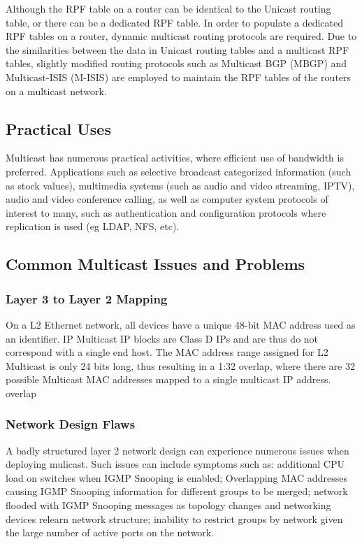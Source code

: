Although the RPF table on a router can be identical to the Unicast
routing table, or there can be a dedicated RPF table. In order to 
populate a dedicated RPF tables on a router, dynamic multicast 
routing protocols are required. Due to the similarities between the data
in Unicast routing tables and a multicast RPF tables, slightly modified
routing protocols such as Multicast BGP (MBGP) and Multicast-ISIS
(M-ISIS) are employed to maintain the RPF tables of the routers on a
multicast network.

\subsection{Practical Uses}

Multicast has numerous practical activities, where efficient use of
bandwidth is preferred. Applications such as selective broadcast
categorized information (such as stock values), multimedia systems (such
as audio and video streaming, IPTV), audio and video conference calling, 
as well as computer system protocols of interest to many, such as
authentication and configuration protocols where replication is
used (eg LDAP, NFS, etc).

\subsection{Common Multicast Issues and Problems}

\subsubsection{Layer 3 to Layer 2 Mapping}

On a L2 Ethernet network, all devices have a unique 48-bit MAC address
used as an identifier. IP Multicast IP blocks are Class D IPs and are 
thus do not correspond with a single end host. The MAC address range
assigned for L2 Multicast is only 24 bits long, thus resulting in a 1:32
overlap, where there are 32 possible Multicast MAC addresses mapped to a 
single multicast IP address.
overlap

\subsubsection{Network Design Flaws}

A badly structured layer 2 network design can experience numerous issues
when deploying mulicast. Such issues can include symptoms such as: 
additional CPU load on switches when IGMP Snooping is enabled; 
Overlapping MAC addresses causing IGMP Snooping information for 
different groups to be merged; network flooded with IGMP Snooping 
messages as topology changes and networking devices relearn network 
structure; inability to restrict groups by network given the large
number of active ports on the network.

